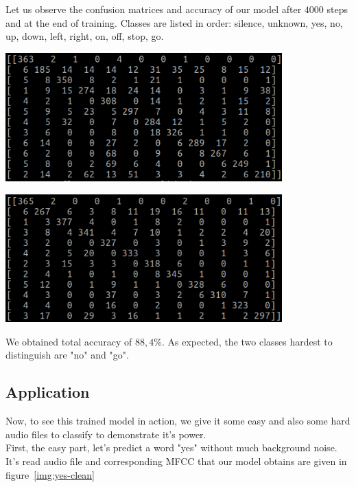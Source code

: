 \documentclass[twoside]{article}
\newenvironment{Figure}
  {\par\medskip\noindent\minipage{\linewidth}}
  {\endminipage\par\medskip}
\begin{document}
\begin{multicols}{2}
Let us observe the confusion matrices and accuracy of our model after $4000$ steps and at the end of training. Classes are listed in order: silence, unknown, yes, no, up, down, left, right, on, off, stop, go.

\begin{Figure}
	\centering
	\includegraphics[width=0.8\textwidth]{train_4000}
	\label{img:tr-4000}
\end{Figure}

\begin{Figure}
	\centering
	\includegraphics[width=0.8\textwidth]{train_18000}
	\label{img:tr-4000}
\end{Figure}

\noindent We obtained total accuracy of $88,4\%$. As expected, the two classes hardest to distinguish are "no" and "go". 

\subsection{Application}
Now, to see this trained model in action, we give it some easy and also some hard audio files to classify to demonstrate it's power.\\

First, the easy part, let's predict a word "yes" without much background noise. It's read audio file and corresponding MFCC that our model obtains are given in figure~\ref{img:yes-clean}


\end{multicols}
\end{document}
